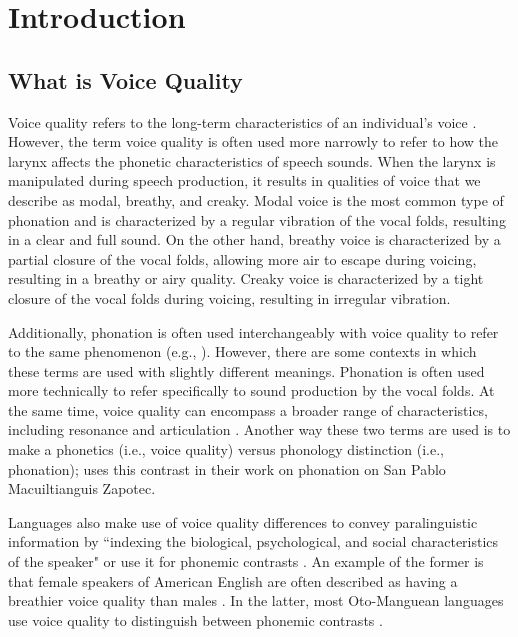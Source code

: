 \chapter{Introduction} \label{chap:introduction}


\section{What is Voice Quality} \label{sec:voice_quality}
Voice quality refers to the long-term characteristics of an individual's voice \citep{abercrombieElementsGeneralPhonetics1967,laverPhoneticDescriptionVoice1980}. However, the term voice quality is often used more narrowly to refer to how the larynx affects the phonetic characteristics of speech sounds. When the larynx is manipulated during speech production, it results in qualities of voice that we describe as modal, breathy, and creaky. Modal voice is the most common type of phonation and is characterized by a regular vibration of the vocal folds, resulting in a clear and full sound. On the other hand, breathy voice is characterized by a partial closure of the vocal folds, allowing more air to escape during voicing, resulting in a breathy or airy quality. Creaky voice is characterized by a tight closure of the vocal folds during voicing, resulting in irregular vibration.

Additionally, phonation is often used interchangeably with voice quality to refer to the same phenomenon (e.g., \cite{keatingPhonationContrastsLanguages}). However, there are some contexts in which these terms are used with slightly different meanings. Phonation is often used more technically to refer specifically to sound production by the vocal folds. At the same time, voice quality can encompass a broader range of characteristics, including resonance and articulation \citep{eslingVoiceQualityLaryngeal2019}. Another way these two terms are used is to make a phonetics (i.e., voice quality) versus phonology distinction (i.e., phonation); \citet{barzilaiContextdependentPhoneticEnhancement2021} uses this contrast in their work on phonation on San Pablo Macuiltianguis Zapotec. 

Languages also make use of voice quality differences to convey paralinguistic information by ``indexing the biological, psychological, and social characteristics of the speaker" \citep{laverVoiceQualityIndexical1968,podesvaStanceWindowLanguageRace2016} or use it for phonemic contrasts \citep{ladefogedSoundsWorldsLanguages1996}. An example of the former is that female speakers of American English are often described as having a breathier voice quality than males \citep[e.g.,][]{klattAnalysisSynthesisPerception1990}. In the latter, most Oto-Manguean languages use voice quality to distinguish between phonemic contrasts \citep{lillehaugenOtomangueanLanguages2019}. 


